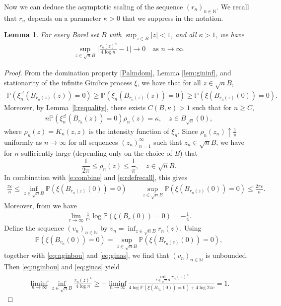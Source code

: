 \documentclass{amsart}
\theoremstyle{plain}
\newtheorem{lemma}[theorem]{Lemma}
\theoremstyle{definition}
\theoremstyle{remark}
\def\P{\mathbb P}
\begin{document}
Now we can deduce the asymptotic scaling of the sequence $(r_n)_{n \in \mathbb N}$. We recall that $r_n$ depends on a parameter $\kappa>0$ that we suppress in the notation.

\begin{lemma} \label{lem:int}
For every Borel set $B$ with $\sup_{z \in B} |z|<1$, and all $\kappa>1$, we have
	\begin{align*}
		\sup_{z \in \sqrt n B}\Big|\frac{r_n(z)^4}{4 \log n} -1\Big|\to 0\quad \text{as }n \to \infty.
	\end{align*}
\end{lemma}


\begin{proof}
From the domination property 
\eqref{Palmdom},
 Lemma \ref{lem:gininf}, and stationarity of the infinite Ginibre process $\xi$, we have that for all $z \in \sqrt n B$,
\begin{align}\label{e:combine}
	\P(\xi_n^{z!}(B_{r_n(z)}(z))=0) \ge 	\P(\xi_n(B_{r_n(z)}(z))=0) \ge 	\P(\xi(B_{r_n(z)}(0))=0).
\end{align}
Moreover, by 
	Lemma~\ref{l:requality}, there exists $C(B,\kappa) > 1$ such that for $n \ge C$, 
\begin{align}\label{e:rdefrecall}
	n\P(\xi_n^{z!}(B_{r_n}(z))=0) \rho_n(z) =\kappa ,\quad z \in B_{\sqrt n}(0),
\end{align}
	where $\rho_n(z)=K_n(z,z)$ is the intensity function of $\xi_n$. Since $  \rho_n( z_n) \uparrow \frac 1 \pi$ uniformly as $n \to \infty$ for all sequences $(z_n)_{n=1}^\infty$ such that $z_n \in \sqrt{n}B$, we have for $n$ sufficiently large (depending only on the choice of $B$) that 
	$$
	\frac 1{2\pi  } \le \rho_n(z) \le \frac 1{\pi },\quad z \in \sqrt{n} B.
	$$
	In combination with \eqref{e:combine} and \eqref{e:rdefrecall}, this gives
\begin{align}
\frac{\pi c }{n}
\le
\inf_{z \in \sqrt n B} \P(\xi(B_{ r_n(z)}(0))=0) 
 \qquad 
\sup_{z \in \sqrt n B} \P(\xi(B_{ r_n(z)}(0))=0) \le \frac{2\pi c}{n}.\label{eq:nginbou}
\end{align}
Moreover, from \cite[Proposition 7.2.1]{BKPV09} we have
\begin{align}
\lim_{r\rightarrow \infty} \frac{1}{r^4}  \log\P(\xi (B_{r}(0))=0) = - \frac{1}{4}. \label{eq:ginas}
\end{align}
Define the sequence 
$(v_n)_{n \in \mathbb N}$
by  $v_n = \inf_{z \in \sqrt n B} r_n(z)$.
Using
\[\P(\xi(B_{v_n}(0))=0) =
\sup_{z \in \sqrt n B} \P(\xi(B_{ r_n(z)}(0))=0), \]
together with \eqref{eq:nginbou} and \eqref{eq:ginas}, we find that $(v_n)_{n \in \mathbb N}$ is unbounded.
Then  \eqref{eq:nginbou} and \eqref{eq:ginas} yield
\begin{align}
		\liminf_{n \to \infty} \inf_{z\in \sqrt nB}\frac{r_n(z)^4}{4 \log n}\ge -	\liminf_{n \to \infty} \frac{\inf_{z\in \sqrt nB} r_n(z)^4}{4 \log  \P(\xi(B_{v_n}(0))=0) + 4 \log 2\pi c }  =  1.\label{e:suplower}
\end{align}
	

\end{proof}
\end{document}
